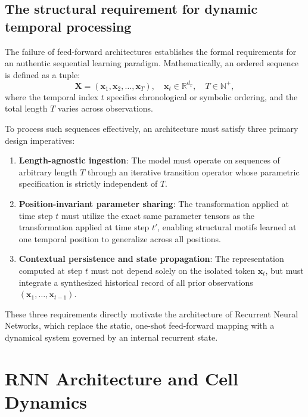 \documentclass[../../main.tex]{subfiles}
\begin{document}
\subsection{The structural requirement for dynamic temporal processing}
\label{subsec:rnn_dynamic_temporal_processing}

The failure of feed-forward architectures establishes the formal requirements for an authentic sequential learning paradigm. Mathematically, an ordered sequence is defined as a tuple:
\begin{equation}
\mathbf{X} = \left(\mathbf{x}_1, \mathbf{x}_2, \dots, \mathbf{x}_T\right), \quad \mathbf{x}_t \in \mathbb{R}^{d_x}, \quad T \in \mathbb{N}^+,
\end{equation}
where the temporal index $t$ specifies chronological or symbolic ordering, and the total length $T$ varies across observations.

To process such sequences effectively, an architecture must satisfy three primary design imperatives:
\begin{enumerate}
    \item \textbf{Length-agnostic ingestion}: The model must operate on sequences of arbitrary length $T$ through an iterative transition operator whose parametric specification is strictly independent of $T$.
    \item \textbf{Position-invariant parameter sharing}: The transformation applied at time step $t$ must utilize the exact same parameter tensors as the transformation applied at time step $t'$, enabling structural motifs learned at one temporal position to generalize across all positions.
    \item \textbf{Contextual persistence and state propagation}: The representation computed at step $t$ must not depend solely on the isolated token $\mathbf{x}_t$, but must integrate a synthesized historical record of all prior observations $\left(\mathbf{x}_1, \dots, \mathbf{x}_{t-1}\right)$.
\end{enumerate}

These three requirements directly motivate the architecture of Recurrent Neural Networks, which replace the static, one-shot feed-forward mapping with a dynamical system governed by an internal recurrent state.

\clearpage
\section{RNN Architecture and Cell Dynamics}
\label{sec:rnn_intuition_mechanics}
\end{document}
